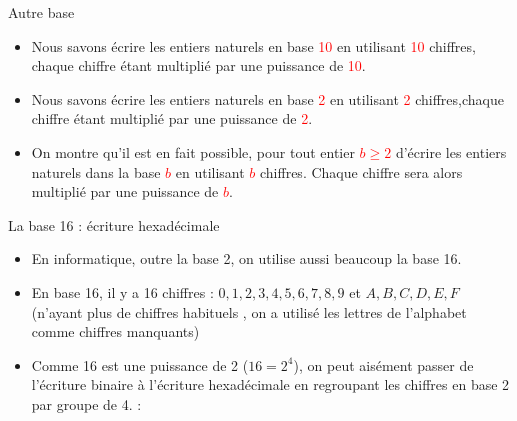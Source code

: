 \documentclass[10pt]{beamer}
\begin{document}
\begin{frame}
	\mframe{\Encodage}
	\begin{block}{Autre base}
		\begin{itemize}
			\item<1-> Nous savons écrire les entiers naturels en base \textcolor{red}{10} en utilisant \textcolor{red}{10} chiffres, chaque chiffre étant multiplié par une puissance de \textcolor{red}{10}.
			\item<2-> Nous savons écrire les entiers naturels en base \textcolor{red}{2} en utilisant \textcolor{red}{2} chiffres,chaque chiffre étant multiplié par une puissance de \textcolor{red}{2}.
			\item<3-> On montre qu'il est en fait possible, pour tout entier \textcolor{red}{$b \geq 2$} d'écrire les entiers naturels dans la base \textcolor{red}{$b$} en utilisant \textcolor{red}{$b$} chiffres. Chaque chiffre sera alors multiplié par une puissance de \textcolor{red}{$b$}.
		\end{itemize}
	\end{block}
\end{frame}


\begin{frame}
	\mframe{\Encodage}
	\begin{alertblock}{La base 16 : écriture hexadécimale}
		\begin{itemize}
			\item<1-> En informatique, outre la base 2, on utilise aussi beaucoup la base 16.
			\item<2-> En base 16, il y a 16 chiffres : $0,1,2,3,4,5,6,7,8,9$ et $A,B,C,D,E,F$ (n'ayant plus de \og chiffres habituels \fg, on a utilisé les lettres de l'alphabet comme chiffres manquants)
			\item<3-> Comme 16 est une puissance de 2 ($16=2^4$),  on peut aisément passer de l'écriture binaire à l'écriture hexadécimale en regroupant les chiffres en base 2 par groupe de 4. :\\
		\end{itemize}
	\end{alertblock}
\end{frame}
\end{document}
